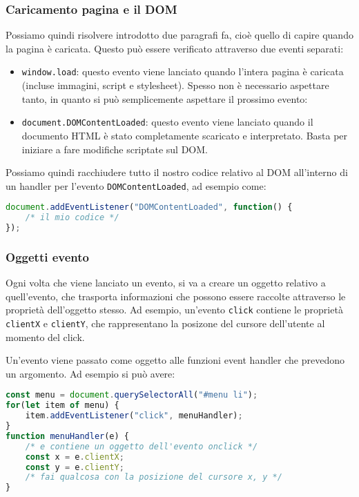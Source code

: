 \documentclass[a4paper,11pt]{article}
\begin{document}
\subsubsection{Caricamento pagina e il DOM}
Possiamo quindi risolvere introdotto due paragrafi fa, cioè quello di capire quando la pagina è caricata.
Questo può essere verificato attraverso due eventi separati:
\begin{itemize}
	\item \lstinline|window.load|: questo evento viene lanciato quando l'intera pagina è caricata (incluse immagini, script e stylesheet). Spesso non è necessario aspettare tanto, in quanto si può semplicemente aspettare il prossimo evento:
	\item \lstinline|document.DOMContentLoaded|: questo evento viene lanciato quando il documento HTML è stato completamente scaricato e interpretato. Basta per iniziare a fare modifiche scriptate sul DOM.
\end{itemize}

Possiamo quindi racchiudere tutto il nostro codice relativo al DOM all'interno di un handler per l'evento \lstinline|DOMContentLoaded|, ad esempio come:
\begin{lstlisting}[language=javascript, style=codestyle]	
document.addEventListener("DOMContentLoaded", function() {
	/* il mio codice */
});
\end{lstlisting}

\subsubsection{Oggetti evento}
Ogni volta che viene lanciato un evento, si va a creare un oggetto relativo a quell'evento, che trasporta informazioni che possono essere raccolte attraverso le proprietà dell'oggetto stesso.
Ad esempio, un'evento \lstinline|click| contiene le proprietà \lstinline|clientX| e \lstinline|clientY|, che rappresentano la posizone del cursore dell'utente al momento del click.

Un'evento viene passato come oggetto alle funzioni event handler che prevedono un argomento. Ad esempio si può avere: 
\begin{lstlisting}[language=javascript, style=codestyle]	
const menu = document.querySelectorAll("#menu li");
for(let item of menu) {
	item.addEventListener("click", menuHandler);
}
function menuHandler(e) {
	/* e contiene un oggetto dell'evento onclick */
	const x = e.clientX;
	const y = e.clientY;
	/* fai qualcosa con la posizione del cursore x, y */
}
\end{lstlisting}
\end{document}
